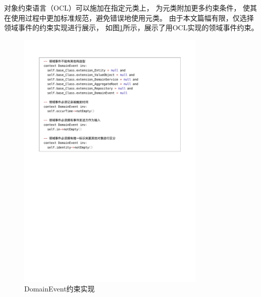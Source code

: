 对象约束语言（OCL）可以施加在指定元类上，
为元类附加更多约束条件，
使其在使用过程中更加标准规范，避免错误地使用元类。
由于本文篇幅有限，仅选择领域事件的约束实现进行展示，
如图\ref{DomainEventOCL}所示，展示了用OCL实现的领域事件约束。\\

\begin{figure}[!htbp] %
    \centering %
    \includegraphics[width=0.8\textwidth]{FIGs/chapter3/DomainEventOCL.pdf} %
    \caption{DomainEvent约束实现} %
    \label{DomainEventOCL} %
\end{figure}%



